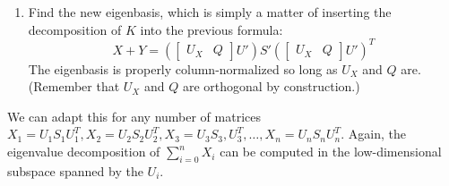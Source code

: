 \documentclass[english]{article}
\begin{document}
\begin{enumerate}
\item Find the new eigenbasis, which is simply a matter of inserting the decomposition of $K$ into the previous formula:
\begin{equation} \label{result} X + Y = \left(\left[\begin{array}{cc} U_X & Q\end{array}\right] U'\right) S' \left(\left[\begin{array}{cc} U_X & Q\end{array}\right] U'\right)^T \end{equation}
The eigenbasis is properly column-normalized so long as $U_X$ and $Q$ are.  (Remember that $U_X$ and $Q$ are orthogonal by construction.)

\end{enumerate}

We can adapt this for any number of matrices $X_1 = U_1 S_1 U_1^T, X_2 = U_2 S_2 U_2^T, X_3 = U_3 S_3, U_3^T, \ldots, X_n = U_n S_n U_n^T$. Again, the eigenvalue decomposition of $\sum_{i=0}^n X_i$ can be computed in the low-dimensional subspace spanned by the $U_i$.
\end{document}
